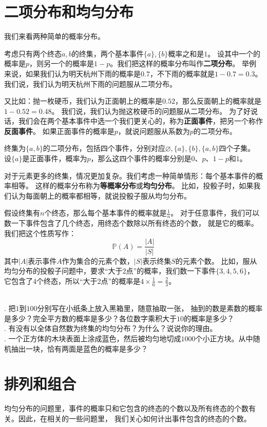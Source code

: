 \documentclass[12pt,UTF8,fontset=none]{ctexbook}
\begin{document}
\section{二项分布和均匀分布}

我们来看两种简单的概率分布。

考虑只有两个终态$a, b$的终集，两个基本事件$\{a\}, \{b\}$概率之和是$1$。
设其中一个的概率是$p$，则另一个的概率是$1-p$。我们把这样的概率分布叫作\textbf{二项分布}。
举例来说，如果我们认为明天杭州下雨的概率是$0.7$，不下雨的概率就是$1-0.7=0.3$。
我们说，我们认为明天杭州下雨的问题服从二项分布。

又比如：抛一枚硬币，我们认为正面朝上的概率是$0.52$，那么反面朝上的概率就是$1 - 0.52 = 0.48$。
我们说，我们认为抛这枚硬币的问题服从二项分布。
为了好说话，我们会在两个基本事件中选一个我们更关心的，称为\textbf{正面事件}，把另一个称作\textbf{反面事件}。
如果正面事件的概率是$p$，就说问题服从系数为$p$的二项分布。

终集为$\{a, b\}$的二项分布，包括四个事件，分别对应$\varnothing, \{a\}, \{b\}, \{a, b\}$四个子集。
设$\{a\}$是正面事件，概率为$p$，那么这四个事件的概率分别是$0$、$p$、$1-p$和$1$。

对于元素更多的终集，情况更加复杂。我们考虑一种简单情形：每个基本事件的概率相等。
这样的概率分布称为\textbf{等概率分布}或\textbf{均匀分布}。
比如，投骰子时，如果我们认为每面朝上的概率都相等，就说投骰子服从均匀分布。

假设终集有$n$个终态，那么每个基本事件的概率就是$\frac{1}{n}$。
对于任意事件，我们可以数一下事件包含了几个终态，用终态个数除以所有终态的个数，
就是它的概率。我们把这个性质写作：
$$ \mathbb{P}(A) = \frac{|A|}{|S|} $$
其中$|A|$表示事件$A$作为集合的元素个数，$|S|$表示终集$S$的元素个数。 
比如，服从均匀分布的投骰子问题中，要求“大于$2$点”的概率，我们数一下事件$\{3,4,5,6\}$，
它包含了$4$个终态，所以“大于$2$点”的概率是$4 \times \frac{1}{6} = \frac{2}{3}$。

\begin{xt}
    \mbox{} \\
    . 把$1$到$100$分别写在小纸条上放入黑箱里，随意抽取一张，
    抽到的数是素数的概率是多少？完全平方数的概率是多少？各位数字乘积大于$10$的概率是多少？ \\
    . 有没有以全体自然数为终集的均匀分布？为什么？说说你的理由。\\
    . 一个正方体的木块表面上涂成蓝色，然后被均匀地切成$1000$个小正方块。从中随机抽出一块，恰有两面是蓝色的概率是多少？
\end{xt}

\section{排列和组合}
均匀分布的问题里，事件的概率只和它包含的终态的个数以及所有终态的个数有关。因此，在相关的一些问题里，
我们关心如何计出事件包含的终态的个数。
\end{document}
